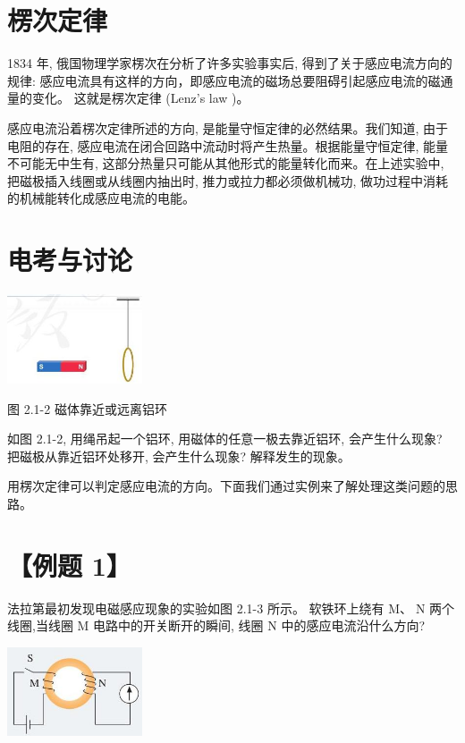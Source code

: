 \documentclass[10pt]{article}
\begin{document}
\section*{楞次定律}

1834 年, 俄国物理学家楞次在分析了许多实验事实后, 得到了关于感应电流方向的规律: 感应电流具有这样的方向，即感应电流的磁场总要阻碍引起感应电流的磁通量的变化。 这就是楞次定律 (Lenz's law )。

感应电流沿着楞次定律所述的方向, 是能量守恒定律的必然结果。我们知道, 由于电阻的存在, 感应电流在闭合回路中流动时将产生热量。根据能量守恒定律, 能量不可能无中生有, 这部分热量只可能从其他形式的能量转化而来。在上述实验中, 把磁极插入线圈或从线圈内抽出时, 推力或拉力都必须做机械功, 做功过程中消耗的机械能转化成感应电流的电能。

\section*{电考与讨论}

\begin{center}
\includegraphics[max width=0.3\textwidth]{images/01910e72-c5b7-7ed5-a6d4-fb3a5faefc32_31_612489.jpg}
\end{center}

图 2.1-2 磁体靠近或远离铝环

如图 2.1-2, 用绳吊起一个铝环, 用磁体的任意一极去靠近铝环, 会产生什么现象? 把磁极从靠近铝环处移开, 会产生什么现象? 解释发生的现象。

用楞次定律可以判定感应电流的方向。下面我们通过实例来了解处理这类问题的思路。

\section*{【例题 1】}

法拉第最初发现电磁感应现象的实验如图 2.1-3 所示。 软铁环上绕有 \(\mathrm{M}\text{、}\mathrm{\;N}\) 两个线圈,当线圈 \(\mathrm{M}\) 电路中的开关断开的瞬间, 线圈 \(\mathrm{N}\) 中的感应电流沿什么方向?

\begin{center}
\includegraphics[max width=0.3\textwidth]{images/01910e72-c5b7-7ed5-a6d4-fb3a5faefc32_32_496896.jpg}
\end{center}
\end{document}

